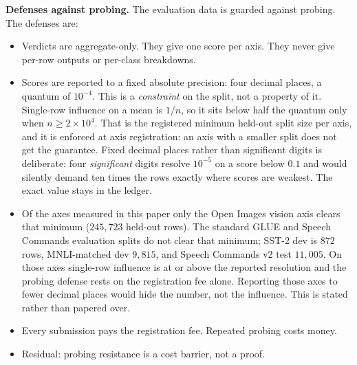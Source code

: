 \documentclass[11pt]{article}
\begin{document}
\textbf{Defenses against probing.} The evaluation data is
guarded against probing. The defenses are:
\begin{itemize}
    \item Verdicts are aggregate-only. They give one score per axis.
          They never give per-row outputs or per-class breakdowns.
    \item Scores are reported to a fixed absolute precision: four
          decimal places, a quantum of $10^{-4}$. This is a
          \emph{constraint} on the split, not a property of it. Single-row
          influence on a mean is $1/n$, so it sits below half the quantum
          only when $n \geq 2 \times 10^{4}$. That is the registered
          minimum held-out split size per axis, and it is enforced at axis
          registration: an axis with a smaller split does not get the
          guarantee. Fixed decimal places rather than significant digits is
          deliberate: four \emph{significant} digits resolve $10^{-5}$
          on a score below $0.1$ and would silently demand ten times the
          rows exactly where scores are weakest. The exact value stays in
          the ledger.
    \item Of the axes measured in this paper only the Open Images
          vision axis clears that minimum ($245{,}723$ held-out rows). The
          standard GLUE and Speech Commands evaluation splits do not clear that minimum; SST-2 dev is $872$ rows, MNLI-matched
          dev $9{,}815$, and Speech Commands v2 test $11{,}005$. On those axes single-row
          influence is at or above the reported resolution and the
          probing defense rests on the registration fee alone. Reporting
          those axes to fewer decimal places would hide the number, not the
          influence. This is stated rather than papered over.
    \item Every submission pays the registration fee. Repeated
          probing costs money.
    \item Residual: probing resistance is a cost barrier, not a
          proof.
\end{itemize}
\end{document}
